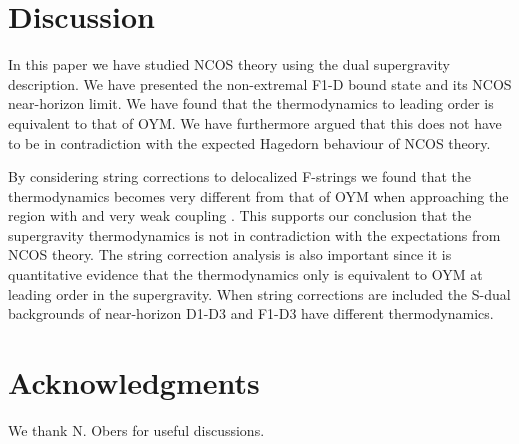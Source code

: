 \documentclass[a4paper,twoside,titlepage,12pt]{article}
\begin{document}
\section{Discussion}

In this paper we have studied NCOS theory using the 
dual supergravity description.
We have presented the non-extremal F1-D\coordHE{} bound state 
and its NCOS near-horizon limit.
We have found that the thermodynamics to leading order is 
equivalent to that of OYM.
We have furthermore argued that this does not have to be in contradiction
with the expected Hagedorn behaviour of NCOS theory.

By considering string corrections to delocalized F-strings we found
that the thermodynamics becomes very different from that of OYM
when approaching the region with \coordHE{} and very weak coupling
\coordHE{}. This supports our conclusion that the supergravity
thermodynamics is not in contradiction with the expectations from NCOS theory.
The string correction analysis is also important since it is quantitative 
evidence that the thermodynamics only is equivalent to
OYM at leading order
in the supergravity. When string corrections are included
the S-dual backgrounds of near-horizon D1-D3 and F1-D3 have 
different thermodynamics.



\section*{Acknowledgments}

We thank N. Obers for useful discussions.


\end{document}
